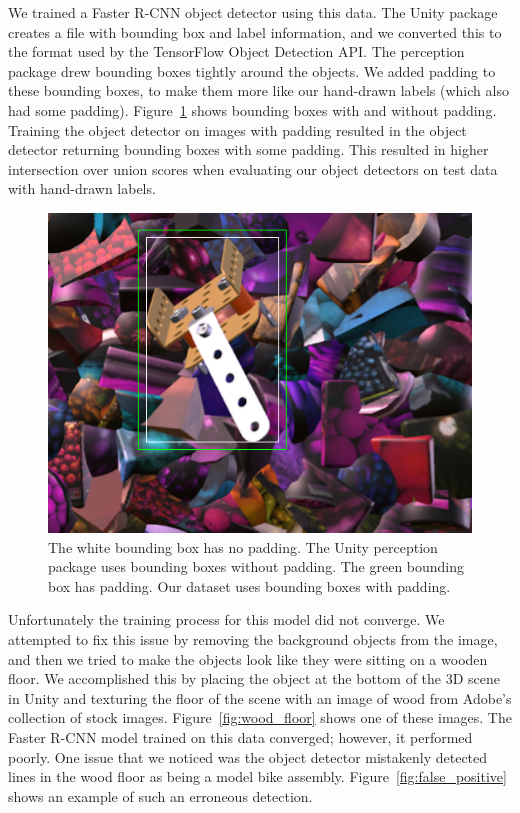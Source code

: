 We trained a Faster R-CNN object detector using this data.
The Unity package creates a file with bounding box and label information, and
we converted this to the format used by the TensorFlow Object Detection API.
The perception package drew bounding boxes tightly around the objects.
We added padding to these bounding boxes, to make them more like our hand-drawn
labels (which also had some padding).
Figure~\ref{fig:padding} shows bounding boxes with and without padding.
Training the object detector on images with padding resulted in the object
detector returning bounding boxes with some padding.
This resulted in higher intersection over union scores when evaluating our
object detectors on test data with hand-drawn labels.

\begin{figure}
  \includegraphics[width=\columnwidth]{figures/synthetic/padding.png}
  \caption{
    The white bounding box has no padding.
    The Unity perception package uses bounding boxes without padding.
    The green bounding box has padding.
    Our dataset uses bounding boxes with padding.
  }\label{fig:padding}
\end{figure}

Unfortunately the training process for this model did not converge.
We attempted to fix this issue by removing the background objects from the
image, and then we tried to make the objects look like they were sitting on a
wooden floor.
We accomplished this by placing the object at the bottom of the 3D scene in
Unity and texturing the floor of the scene with an image of wood from Adobe's
collection of stock images.
Figure~\ref{fig:wood_floor} shows one of these images.
The Faster R-CNN model trained on this data converged; however, it performed
poorly.
One issue that we noticed was the object detector mistakenly detected lines
in the wood floor as being a model bike assembly.
Figure~\ref{fig:false_positive} shows an example of such an erroneous detection.

